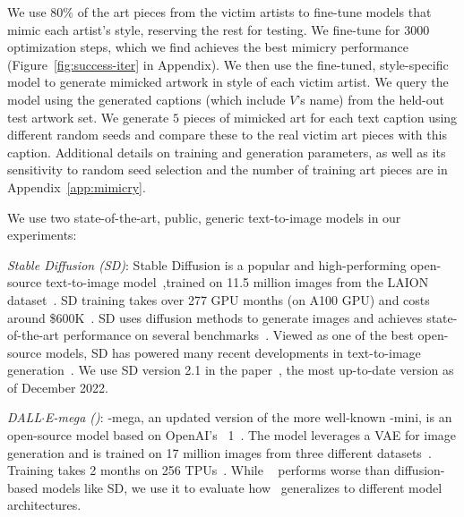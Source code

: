 We use $80\%$ of the art pieces from the victim artists to fine-tune models
that mimic each artist's style, reserving the rest for testing. We fine-tune
for $3000$ optimization steps, which we find achieves the best mimicry
performance (Figure~\ref{fig:success-iter} in Appendix). We then use the
fine-tuned, style-specific model to generate mimicked artwork in style of
each victim artist. We query the model using the generated captions (which
include $V$'s name) from the held-out test artwork set. We generate $5$
pieces of mimicked art for each text caption using different random seeds and
compare these to the real victim art pieces with this caption. Additional
details on training and generation parameters, as well as its sensitivity to
random seed selection and the number of training art pieces are in Appendix~\ref{app:mimicry}.  


 We use two state-of-the-art, public, generic text-to-image models in our experiments: 

\vspace{-0.2cm}
\begin{packed_itemize}
\item \textit{Stable Diffusion (SD)}: Stable Diffusion is a popular and
  high-performing open-source text-to-image model~\cite{stable2-1},trained
  on 11.5 million images from the LAION dataset~\cite{schuhmann2022laion}. SD
  training takes over 277 GPU months (on A100 GPU) and costs around
  \$600K~\cite{stable2-1}. SD uses diffusion methods to generate images and
  achieves state-of-the-art performance on several
  benchmarks~\cite{rombach2022high}. Viewed as one of the best open-source
  models, SD has powered many recent developments in text-to-image
  generation~\cite{blender-plugin,novelai-update,gimp,aigame}. We
  use SD version 2.1 in the paper~\cite{stable2-1}, the most up-to-date
  version as of December 2022.  

\item \textit{DALL$\cdot$E-mega (\dalleM)}: \dalleM-mega, an updated version
  of the more well-known \dalleM-mini, is an open-source model based on
  OpenAI's \dalleM~1~\cite{ramesh2021zero}. The model leverages a VAE for
  image generation and is trained on 17 million images from three different
  datasets~\cite{sharma-etal-2018-conceptual,changpinyo2021conceptual,thomee2016yfcc100m}. Training
  takes 2 months on 256 TPUs~\cite{mini-training}. While \dalleM~ performs
  worse than diffusion-based models like SD, we use it to evaluate how
  \system~generalizes to different model architectures.  
\end{packed_itemize}

